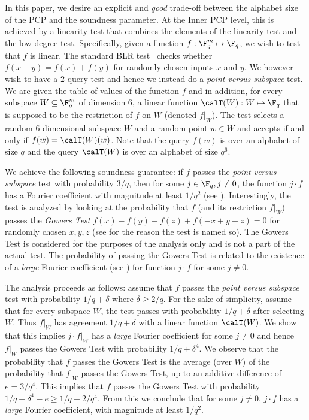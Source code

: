 In this paper, we desire an explicit and \emph{good} trade-off between the alphabet size of the PCP and the
soundness parameter. At the Inner PCP level, this is achieved by a linearity test that combines
the elements of the linearity test and the low degree test. Specifically, given
a function  $f: \F_q^m \mapsto \F_q$, we wish to test that $f$ is linear. The standard
BLR test~\cite{BLR}
checks whether $f(x+y)=f(x)+f(y)$ for randomly chosen inputs $x$ and $y$. We
however wish to have a $2$-query test and hence we instead do a \emph{point versus subspace}
test. We are given the table of values of the function $f$ and in addition, for
every subspace $W \subseteq \F_q^m$ of dimension $6$, a linear function $\calT(W): W \mapsto \F_q$
that is
supposed to be the restriction of $f$ on $W$ (denoted $f|_W$). The test selects a random $6$-dimensional
subspace $W$ and a random point $w \in W$ and accepts if and only if
$f(w) = \calT(W) (w)$. Note that the query $f(w)$ is over an alphabet of size $q$ and the
query $\calT(W)$ is over an alphabet of size $q^6$.



We achieve the following soundness guarantee: if $f$ passes the \emph{point versus subspace}
test with probability ${3}/{q}$, then for some $j \in \F_q, j \not= 0$,
the function $j\cdot f$ has a Fourier coefficient with magnitude at least ${1}/{q^2}$
(see ). Interestingly, the test is analyzed by looking at the
probability that $f$ (and its restriction $f|_W$) passes the \emph{Gowers Test}
$f(x) - f(y) - f(z) + f(-x+y+z)=0$ for randomly chosen $x,y,z$ (see  for the reason the test is named so).
The Gowers Test is considered
for the purposes of the analysis only and is not a part of the actual test. The probability
of passing the Gowers Test is related to the existence of a \emph{large} Fourier coefficient
(see ) for function $j\cdot f$ for some $j \not= 0$.

The analysis proceeds as follows: assume that $f$ passes the \emph{point versus subspace}
test with probability ${1}/{q}+\delta$ where $\delta \geq {2}/{q}$. For the sake of
simplicity, assume that for every subspace $W$,
the test passes with probability ${1}/{q}+\delta$ after selecting $W$. Thus
$f|_W$ has agreement ${1}/{q}+\delta$ with a linear function $\calT(W)$.
We show that
this implies $j \cdot f|_W$ has a \emph{large} Fourier coefficient for some $j \not= 0$
and hence
$f|_W$ passes the Gowers Test with probability
${1}/{q}+\delta^4$. We observe that the probability that $f$ passes the Gowers Test is the average (over $W$)  of the probability that $f|_W$ passes the Gowers Test, up to an additive difference of
$e = {3}/{q^4}$. This implies that $f$ passes the Gowers Test with probability
${1}/{q} + \delta^4 - e \geq {1}/{q} + {2}/{q^4}$. {}From this we conclude that
for some $j \not= 0$, $j \cdot f$ has a \emph{large} Fourier coefficient, with magnitude
at least ${1}/{q^2}$.

